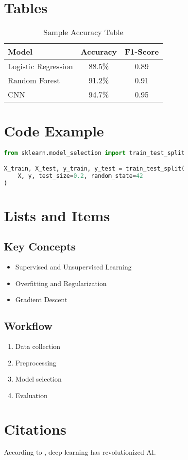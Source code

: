 \documentclass[11pt,a4paper]{article}
\begin{document}
\section{Tables}
\begin{table}[H]
\centering
\caption{Sample Accuracy Table}
\begin{tabular}{lcc}
\toprule
\textbf{Model} & \textbf{Accuracy} & \textbf{F1-Score} \\
\midrule
Logistic Regression & 88.5\% & 0.89 \\
Random Forest       & 91.2\% & 0.91 \\
CNN                 & 94.7\% & 0.95 \\
\bottomrule
\end{tabular}
\label{tab:results}
\end{table}

\section{Code Example}
\begin{lstlisting}[language=Python, caption=Train/Test Split Example]
from sklearn.model_selection import train_test_split

X_train, X_test, y_train, y_test = train_test_split(
    X, y, test_size=0.2, random_state=42
)
\end{lstlisting}

\section{Lists and Items}

\subsection*{Key Concepts}
\begin{itemize}
    \item Supervised and Unsupervised Learning
    \item Overfitting and Regularization
    \item Gradient Descent
\end{itemize}

\subsection*{Workflow}
\begin{enumerate}
    \item Data collection
    \item Preprocessing
    \item Model selection
    \item Evaluation
\end{enumerate}

\section{Citations}
According to \cite{goodfellow2016deep}, deep learning has revolutionized AI.

\printbibliography
\end{document}
